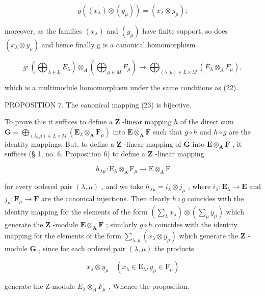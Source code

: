 \[
g ((x _ {\lambda}) \otimes (y _ {\mu})) = (x _ {\lambda} \otimes y _ {\mu});
\]

moreover, as the families \((x_{\lambda})\) and \((y_{\mu})\) have finite support, so does \((x_{\lambda} \otimes y_{\mu})\) and hence finally g is a canonical homomorphism

\[
g: \left(\bigoplus_ {\lambda \in L} E _ {\lambda}\right) \otimes_ {A} \left(\bigoplus_ {\mu \in M} F _ {\mu}\right)\rightarrow \bigoplus_ {(\lambda , \mu) \in L \times M} (E _ {\lambda} \otimes_ {A} F _ {\mu}),\tag{23}
\]

which is a multimodule homomorphism under the same conditions as (22).

PROPOSITION 7. The canonical mapping (23) is bijective.

To prove this it suffices to define a \(\mathbf{Z}\) -linear mapping \(h\) of the direct sum \(\mathbf{G} = \bigoplus_{(\lambda, \mu) \in L \times M} (\mathbf{E}_{\lambda} \otimes_{\mathbf{A}} \mathbf{F}_{\mu})\) into \(\mathbf{E} \otimes_{\mathbf{A}} \mathbf{F}\) such that \(g \circ h\) and \(h \circ g\) are the identity mappings. But, to define a \(\mathbf{Z}\) -linear mapping of \(\mathbf{G}\) into \(\mathbf{E} \otimes_{\mathbf{A}} \mathbf{F}\) , it suffices (§ 1, no. 6, Proposition 6) to define a \(\mathbf{Z}\) -linear mapping

\[
h _ {\lambda \mu}: \mathrm{E} _ {\lambda} \otimes_ {\mathrm{A}} \mathrm{F} _ {\mu} \rightarrow \mathrm{E} \otimes_ {\mathrm{A}} \mathrm{F}
\]

for every ordered pair \((\lambda, \mu)\) , and we take \(h_{\lambda \mu} = i_{\lambda} \otimes j_{\mu}\) , where \(i_{\lambda}: \mathbf{E}_{\lambda} \to \mathbf{E}\) and \(j_{\mu}: \mathbf{F}_{\mu} \to \mathbf{F}\) are the canonical injections. Then clearly \(h \circ g\) coincides with the identity mapping for the elements of the form \(\left(\sum_{\lambda} x_{\lambda}\right) \otimes \left(\sum_{\mu} y_{\mu}\right)\) which generate the \(\mathbf{Z}\) -module \(\mathbf{E} \otimes_{\mathbf{A}} \mathbf{F}\) ; similarly \(g \circ h\) coincides with the identity mapping for the elements of the form \(\sum_{\lambda, \mu} (x_{\lambda} \otimes y_{\mu})\) which generate the \(\mathbf{Z}\) -module \(\mathbf{G}\) , since for each ordered pair \((\lambda, \mu)\) the products

\[
x _ {\lambda} \otimes y _ {\mu} \quad (x _ {\lambda} \in \mathrm{E} _ {\lambda}, y _ {\mu} \in \mathrm{F} _ {\mu})
\]

generate the Z-module \(E_{\lambda} \otimes_{A} F_{\mu}\) . Whence the proposition.


